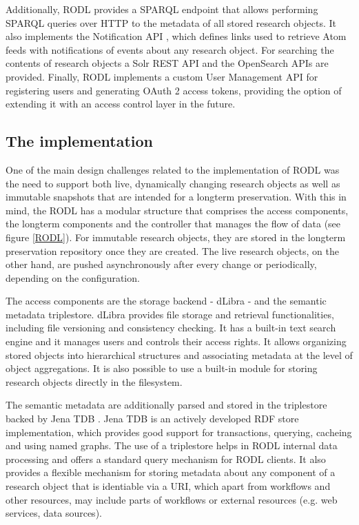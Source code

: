 Additionally, RODL provides a SPARQL endpoint that allows performing SPARQL queries over HTTP to the metadata of all stored research objects. It also implements the Notification API \cite{Notification-API}, which defines links used to retrieve Atom feeds with notifications of events about any research object. For searching the contents of research objects a Solr REST API and the OpenSearch APIs are provided. Finally, RODL implements a custom User Management API \cite{UM-API} for registering users and generating OAuth 2 access tokens, providing the option of extending it with an access control layer in the future.



\subsection{The implementation}

One of the main design challenges related to the implementation of RODL was the need to support both live, dynamically changing research objects as well as immutable snapshots that are intended for a longterm preservation. With this in mind, the RODL has a modular structure that comprises the access components, the longterm components and the controller that manages the flow of data (see figure \ref{RODL}). For immutable research objects, they are stored in the longterm preservation repository once they are created. The live research objects, on the other hand, are pushed asynchronously after every change or periodically, depending on the configuration.

The access components are the storage backend - dLibra \cite{dLibra} - and the semantic metadata triplestore. dLibra provides file storage and retrieval functionalities, including file versioning and consistency checking. It has a built-in text search engine and it manages users and controls their access rights. It allows organizing stored objects into hierarchical structures and associating metadata at the level of object aggregations. It is also possible to use a built-in module for storing research objects directly in the filesystem.

The semantic metadata are additionally parsed and stored in the triplestore backed by Jena TDB \cite{Jena}. Jena TDB is an actively developed RDF store implementation, which provides good support for transactions, querying, cacheing and using named graphs. The use of a triplestore helps in RODL internal data processing and offers a standard query mechanism for RODL clients. It also provides a flexible mechanism for storing metadata about any component of a research object that is identiable via a URI, which apart from workflows and other resources, may include parts of workflows or external resources (e.g. web services, data sources).

